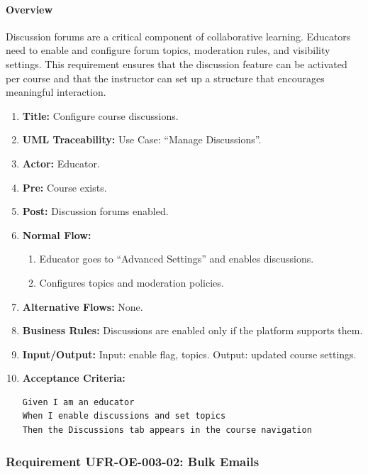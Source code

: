 \paragraph{Overview}
Discussion forums are a critical component of collaborative learning. Educators need to enable and configure forum topics, moderation rules, and visibility settings. This requirement ensures that the discussion feature can be activated per course and that the instructor can set up a structure that encourages meaningful interaction.
\begin{enumerate}[label=\textbf{\arabic*.}]
\item \textbf{Title:} Configure course discussions.
\item \textbf{UML Traceability:} Use Case: “Manage Discussions”.
\item \textbf{Actor:} Educator.
\item \textbf{Pre:} Course exists.
\item \textbf{Post:} Discussion forums enabled.
\item \textbf{Normal Flow:} 
    \begin{enumerate}
        \item Educator goes to “Advanced Settings” and enables discussions.
        \item Configures topics and moderation policies.
    \end{enumerate}
\item \textbf{Alternative Flows:} None.
\item \textbf{Business Rules:} Discussions are enabled only if the platform supports them.
\item \textbf{Input/Output:} Input: enable flag, topics. Output: updated course settings.
\item \textbf{Acceptance Criteria:}
    \begin{verbatim}
Given I am an educator
When I enable discussions and set topics
Then the Discussions tab appears in the course navigation
    \end{verbatim}
\end{enumerate}

\subsubsection{Requirement UFR-OE-003-02: Bulk Emails}
